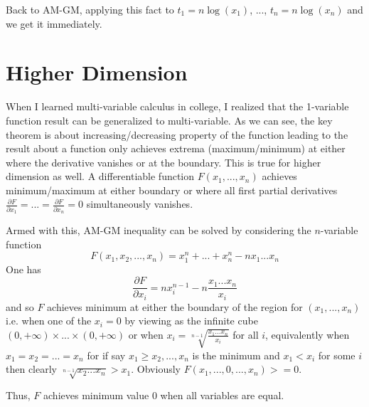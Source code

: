 \documentclass[10pt]{amsart}
\begin{document}
Back to AM-GM, applying this fact to $t_1 = n \log(x_1)$, ..., $t_n = n \log(x_n)$ and we get it immediately.

\section{Higher Dimension}

When I learned multi-variable calculus in college, I realized that the 1-variable function result can be generalized to multi-variable. As we can see, the key theorem is about increasing/decreasing property of the function leading to the result about a function only achieves extrema (maximum/minimum) at either where the derivative vanishes or at the boundary. This is true for higher dimension as well. A differentiable function $F(x_1, ..., x_n)$ achieves minimum/maximum at either boundary or where all first partial derivatives $\frac{\partial F}{\partial x_1} = ... = \frac{\partial F}{\partial x_n} = 0$ simultaneously vanishes.

Armed with this, AM-GM inequality can be solved by considering the $n$-variable function
$$F(x_1,x_2,...,x_n) = x_1^n + ... + x_n^n - n x_1 ... x_n$$
One has
$$\frac{\partial F}{\partial x_i} = n x_i^{n-1} - n \frac{x_1 ... x_n}{x_i}$$
and so $F$ achieves minimum at either the boundary of the region for $(x_1,...,x_n)$ i.e. when one of the $x_i = 0$ by viewing as the infinite cube $(0,+\infty) \times ... \times (0,+\infty)$ or when $x_i = \sqrt[n-1]{\frac{x_1 ... x_n}{x_i}}$ for all $i$, equivalently when $x_1 = x_2 = ... = x_n$ for if say $x_1 \geq x_2, ..., x_n$ is the minimum and $x_1 < x_i$ for some $i$ then clearly $\sqrt[n-1]{x_2 ... x_n} > x_1$. Obviously $F(x_1, ..., 0, ..., x_n) >= 0$.

Thus, $F$ achieves minimum value 0 when all variables are equal.
\end{document}

